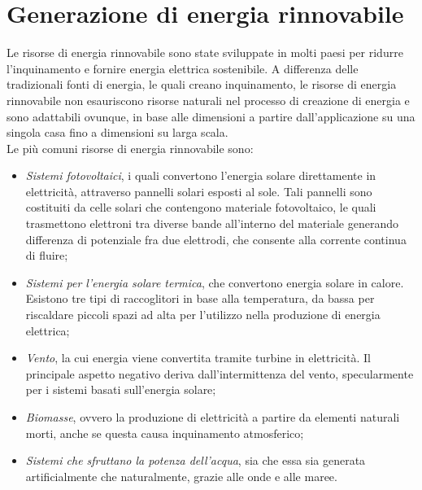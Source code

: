 \section{Generazione di energia rinnovabile}
Le risorse di energia rinnovabile sono state sviluppate in molti paesi per ridurre l'inquinamento e fornire energia elettrica sostenibile. A differenza delle tradizionali fonti di energia, le quali creano inquinamento, le risorse di energia rinnovabile non esauriscono risorse naturali nel processo di creazione di energia e sono adattabili ovunque, in base alle dimensioni a partire dall'applicazione su una singola casa fino a dimensioni su larga scala.
\\
Le più comuni risorse di energia rinnovabile sono:
\begin{itemize}
	\item \emph{Sistemi fotovoltaici}, i quali convertono l'energia solare direttamente in elettricità, attraverso pannelli solari esposti al sole. Tali pannelli sono costituiti da celle solari che contengono materiale fotovoltaico, le quali trasmettono elettroni tra diverse bande all'interno del materiale generando differenza di potenziale fra due elettrodi, che consente alla corrente continua di fluire;
	\item \emph{Sistemi per l'energia solare termica}, che convertono energia solare in calore. Esistono tre tipi di raccoglitori in base alla temperatura, da bassa per riscaldare piccoli spazi ad alta per l'utilizzo nella produzione di energia elettrica;
	\item \emph{Vento}, la cui energia viene convertita tramite turbine in elettricità. Il principale aspetto negativo deriva dall'intermittenza del vento, specularmente per i sistemi basati sull'energia solare;
	\item \emph{Biomasse}, ovvero la produzione di elettricità a partire da elementi naturali morti, anche se questa causa inquinamento atmosferico;
	\item \emph{Sistemi che sfruttano la potenza dell'acqua}, sia che essa sia generata artificialmente che naturalmente, grazie alle onde e alle maree.   
\end{itemize} 

